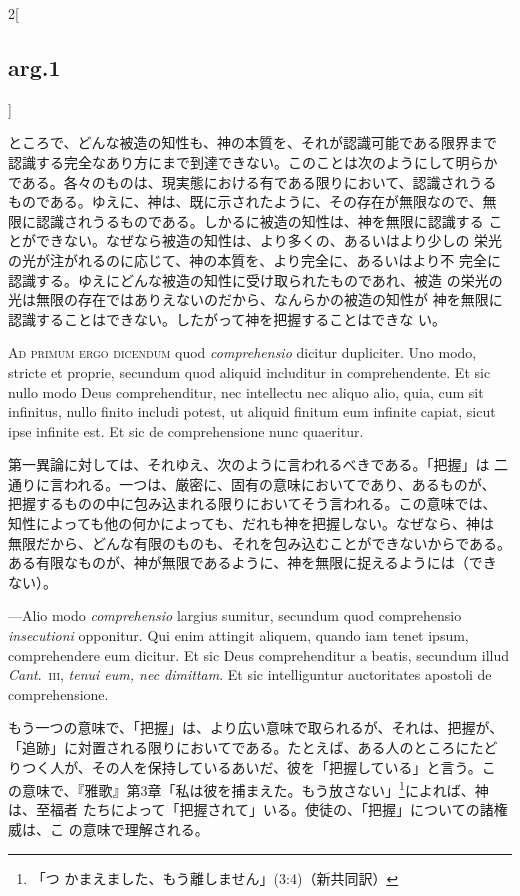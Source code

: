 \documentclass[paper=a4paper,fontsize=10pt,jafontsize=9pt,titlepage]{jlreq}
\begin{document}
\begin{paracol}{2}[\subsection{arg.1}]
\switchcolumn

ところで、どんな被造の知性も、神の本質を、それが認識可能である限界まで
認識する完全なあり方にまで到達できない。このことは次のようにして明らか
である。各々のものは、現実態における有である限りにおいて、認識されうる
ものである。ゆえに、神は、既に示されたように、その存在が無限なので、無
限に認識されうるものである。しかるに被造の知性は、神を無限に認識する
ことができない。なぜなら被造の知性は、より多くの、あるいはより少しの
栄光の光が注がれるのに応じて、神の本質を、より完全に、あるいはより不
完全に認識する。ゆえにどんな被造の知性に受け取られたものであれ、被造
の栄光の光は無限の存在ではありえないのだから、なんらかの被造の知性が
神を無限に認識することはできない。したがって神を把握することはできな
い。

\switchcolumn*[\subsection{ad.1}]

{\scshape Ad primum ergo dicendum} quod {\itshape comprehensio} dicitur
dupliciter. Uno modo, stricte et proprie, secundum quod aliquid
includitur in comprehendente. Et sic nullo modo Deus comprehenditur,
nec intellectu nec aliquo alio, quia, cum sit infinitus, nullo finito
includi potest, ut aliquid finitum eum infinite capiat, sicut ipse
infinite est. Et sic de comprehensione nunc quaeritur.

\switchcolumn

第一異論に対しては、それゆえ、次のように言われるべきである。「把握」は
二通りに言われる。一つは、厳密に、固有の意味においてであり、あるものが、
把握するものの中に包み込まれる限りにおいてそう言われる。この意味では、
知性によっても他の何かによっても、だれも神を把握しない。なぜなら、神は
無限だから、どんな有限のものも、それを包み込むことができないからである。
ある有限なものが、神が無限であるように、神を無限に捉えるようには（でき
ない）。

\switchcolumn*

---Alio modo {\itshape comprehensio} largius sumitur, secundum quod
comprehensio {\itshape insecutioni} opponitur. Qui enim attingit aliquem,
quando iam tenet ipsum, comprehendere eum dicitur. Et sic Deus
comprehenditur a beatis, secundum illud {\itshape Cant}.\ {\scshape iii}, {\itshape
tenui eum, nec dimittam}. Et sic intelliguntur auctoritates apostoli
de comprehensione.

\switchcolumn

もう一つの意味で、「把握」は、より広い意味で取られるが、それは、把握が、
「追跡」に対置される限りにおいてである。たとえば、ある人のところにたど
りつく人が、その人を保持しているあいだ、彼を「把握している」と言う。こ
の意味で、『雅歌』第3章「私は彼を捕まえた。もう放さない」\footnote{「つ
かまえました、もう離しません」(3:4)（新共同訳）}によれば、神は、至福者
たちによって「把握されて」いる。使徒の、「把握」についての諸権威は、こ
の意味で理解される。


\end{paracol}
\end{document}
